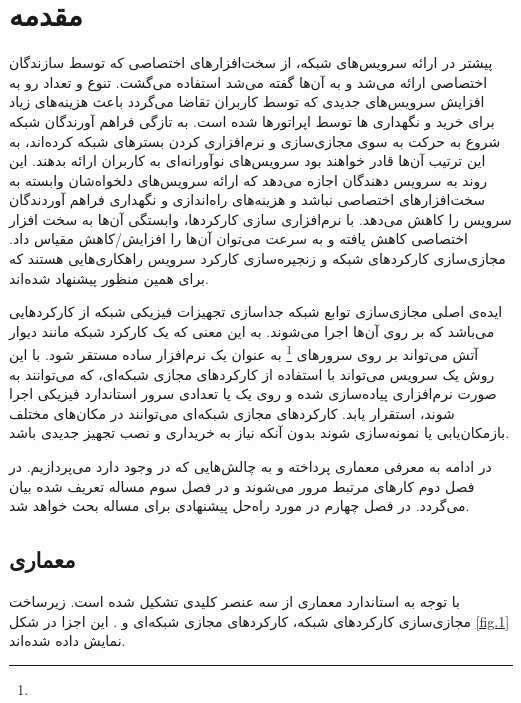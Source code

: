 \chapter{مقدمه}

پیشتر در ارائه سرویس‌های شبکه، از سخت‌افزارهای اختصاصی که توسط سازندگان اختصاصی ارائه می‌شد و به آن‌ها
گفته می‌شد استفاده می‌گشت.
تنوع و تعداد رو به افزایش سرویس‌های جدیدی که توسط کاربران تقاضا می‌گردد
باعث هزینه‌های زیاد برای خرید و نگهداری
‌ها
توسط اپراتورها شده است.
به تازگی فراهم آورندگان شبکه
شروع به حرکت به سوی مجازی‌سازی و نرم‌افزاری کردن بسترهای شبکه کرده‌اند،
به این ترتیب آن‌ها قادر خواهند بود
سرویس‌های نوآورانه‌ای به کاربران ارائه بدهند.
این روند به سرویس دهندگان اجازه می‌دهد که ارائه سرویس‌های دلخواه‌شان وابسته به سخت‌افزارهای اختصاصی نباشد و 
هزینه‌های راه‌اندازی و نگهداری فراهم آوردندگان سرویس را کاهش می‌دهد.
با نرم‌افزاری سازی کارکردها، وابستگی آن‌ها به سخت افزار اختصاصی کاهش یافته و به سرعت می‌توان آن‌ها را افزایش/کاهش مقیاس داد.
مجازی‌سازی کارکردهای شبکه و زنجیره‌سازی کارکرد سرویس‌ راهکاری‌هایی هستند که برای همین منظور پیشنهاد شده‌اند.

ایده‌ی اصلی مجازی‌سازی توابع شبکه جداسازی تجهیزات فیزیکی شبکه از کارکردهایی می‌باشد که
بر روی آن‌ها اجرا می‌شوند.
به این معنی که یک کارکرد شبکه مانند دیوار آتش می‌تواند بر روی سرورهای
\footnote{}
به عنوان یک نرم‌افزار ساده مستقر شود.
با این روش یک سرویس می‌تواند با استفاده از کارکردهای مجازی شبکه‌ای، که می‌توانند به صورت نرم‌افزاری پیاده‌سازی شده
و روی یک یا تعدادی سرور استاندارد فیزیکی اجرا شوند، استقرار یابد.
کارکردهای مجازی شبکه‌ای می‌توانند در مکان‌های مختلف بازمکان‌یابی یا نمونه‌سازی شوند بدون آنکه
نیاز به خریداری و نصب تجهیز جدیدی باشد.
\cite{Mijumbi2016}

در ادامه به معرفی معماری  پرداخته
و به چالش‌هایی که در  وجود دارد می‌پردازیم.
در فصل دوم کارهای مرتبط مرور می‌شوند و در فصل سوم مساله تعریف شده بیان می‌گردد. در فصل چهارم
در مورد راه‌حل پیشنهادی برای مساله بحث خواهد شد.

\section{معماری }
با توجه به استاندارد  معماری 
از سه عنصر کلیدی تشکیل شده است.
زیرساخت مجازی‌سازی کارکردهای شبکه،
کارکردهای مجازی شبکه‌ای و
.
این اجزا در شکل \cref{fig.1} نمایش داده شده‌اند.

